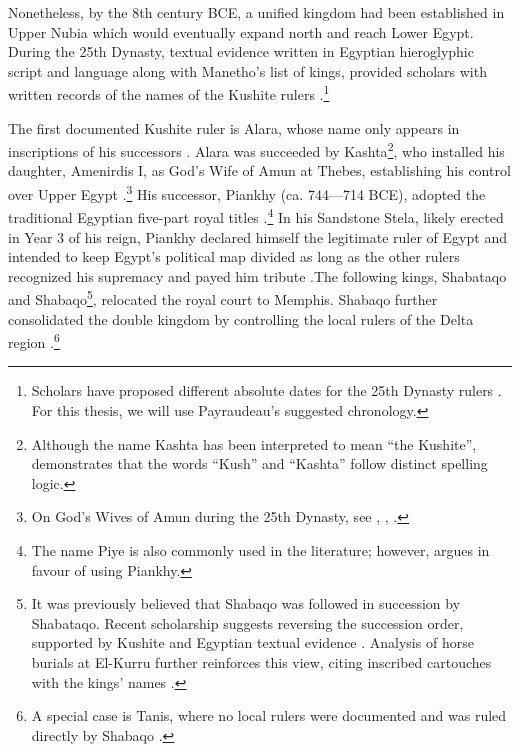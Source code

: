 Nonetheless, by the 8th century BCE, a unified kingdom had been established in Upper Nubia which would eventually expand north and reach Lower Egypt. During the 25th Dynasty, textual evidence written in Egyptian hieroglyphic script and language along with Manetho’s list of kings, provided scholars with written records of the names of the Kushite rulers \parencites{payraudeauRetourSuccessionShabaqoShabataqo2014}{pope25thDynasty2019}.\footnote{Scholars have proposed different absolute dates for the 25th Dynasty rulers \parencites{depuydtDatePiyesEgyptian1993}{kahnInscriptionSargonII2001}{hornungKushiteRulersPre25th2006}{payraudeauRetourSuccessionShabaqoShabataqo2014}. For this thesis, we will use Payraudeau’s suggested chronology.}

The first documented Kushite ruler is Alara, whose name only appears in inscriptions of his successors \parencite[p.~110]{emberlingKushDynastyNapata2023}. Alara was succeeded by Kashta\footnote{Although the name Kashta has been interpreted to mean “the Kushite”, \textcite{vinogradovDidNameKashta2003} demonstrates that the words “Kush” and “Kashta” follow distinct spelling logic.}, who installed his daughter, Amenirdis I, as God’s Wife of Amun at Thebes, establishing his control over Upper Egypt \parencites[p.~319]{torokTwoWorldsFrontier2009}[p.~110]{emberlingKushDynastyNapata2023}.\footnote{On God’s Wives of Amun during the 25th Dynasty, see \cite{ayadGenderRitualManipulation2016}, \cite{beckerFemaleInfluenceAside2016}, \cite{lohwasserNubianessGodsWives2016}.} 
His successor, Piankhy (ca. 744—714 BCE), adopted the traditional Egyptian five-part royal titles \parencites[p.~153]{torokKingdomKushHandbook1997}[p.~324]{torokTwoWorldsFrontier2009}.\footnote{The name Piye is also commonly used in the literature; however, \textcite{rillyNouvelleInterpretationNom2001} argues in favour of using Piankhy.} 
In his Sandstone Stela, likely erected in Year 3 of his reign, Piankhy declared himself the legitimate ruler of Egypt and intended to keep Egypt’s political map divided as long as the other rulers recognized his supremacy and payed him tribute \parencite[p.~155]{torokKingdomKushHandbook1997}.The following kings, Shabataqo and Shabaqo\footnote{It was previously believed that Shabaqo was followed in succession by Shabataqo. Recent scholarship suggests reversing the succession order, supported by Kushite and Egyptian textual evidence \parencites[p.~4-9]{payraudeauRetourSuccessionShabaqoShabataqo2014}{jurmanOrderKushiteKings2017}. Analysis of horse burials at El-Kurru further reinforces this view, citing inscribed cartouches with the kings’ names \parencite{naserKingsHorsesTwo2020}.}, relocated the royal court to Memphis. Shabaqo further consolidated the double kingdom by controlling the local rulers of the Delta region \parencites[p.~166-167]{torokKingdomKushHandbook1997}[p.~141]{rillyHistoireSoudanOrigines2017}.\footnote{A special case is Tanis, where no local rulers were documented and was ruled directly by Shabaqo \parencite{mojeHerrschaftsraumeUndHerrschaftswissen2013}.}
